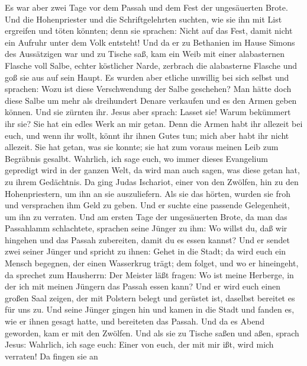  Es war aber zwei Tage vor dem Passah und dem Fest der
ungesäuerten Brote. Und die Hohenpriester und die Schriftgelehrten
suchten, wie sie ihn mit List ergreifen und töten könnten;
 denn sie sprachen: Nicht auf das Fest, damit nicht ein
Aufruhr unter dem Volk entsteht!  Und da er zu Bethanien
im Hause Simons des Aussätzigen war und zu Tische saß, kam ein Weib mit
einer alabasternen Flasche voll Salbe, echter köstlicher Narde, zerbrach
die alabasterne Flasche und goß sie aus auf sein Haupt. 
Es wurden aber etliche unwillig bei sich selbst und sprachen: Wozu ist
diese Verschwendung der Salbe geschehen?  Man hätte doch
diese Salbe um mehr als dreihundert Denare verkaufen und es den Armen
geben können. Und sie zürnten ihr.  Jesus aber sprach:
Lasset sie! Warum bekümmert ihr sie? Sie hat ein edles Werk an mir
getan.  Denn die Armen habt ihr allezeit bei euch, und
wenn ihr wollt, könnt ihr ihnen Gutes tun; mich aber habt ihr nicht
allezeit.  Sie hat getan, was sie konnte; sie hat zum
voraus meinen Leib zum Begräbnis gesalbt.  Wahrlich, ich
sage euch, wo immer dieses Evangelium gepredigt wird in der ganzen Welt,
da wird man auch sagen, was diese getan hat, zu ihrem Gedächtnis.
 Da ging Judas Ischariot, einer von den Zwölfen, hin zu
den Hohenpriestern, um ihn an sie auszuliefern.  Als sie
das hörten, wurden sie froh und versprachen ihm Geld zu geben. Und er
suchte eine passende Gelegenheit, um ihn zu verraten. 
Und am ersten Tage der ungesäuerten Brote, da man das Passahlamm
schlachtete, sprachen seine Jünger zu ihm: Wo willst du, daß wir
hingehen und das Passah zubereiten, damit du es essen kannst?
 Und er sendet zwei seiner Jünger und spricht zu ihnen:
Gehet in die Stadt; da wird euch ein Mensch begegnen, der einen
Wasserkrug trägt; dem folget,  und wo er hineingeht, da
sprechet zum Hausherrn: Der Meister läßt fragen: Wo ist meine Herberge,
in der ich mit meinen Jüngern das Passah essen kann?  Und
er wird euch einen großen Saal zeigen, der mit Polstern belegt und
gerüstet ist, daselbst bereitet es für uns zu.  Und seine
Jünger gingen hin und kamen in die Stadt und fanden es, wie er ihnen
gesagt hatte, und bereiteten das Passah.  Und da es Abend
geworden, kam er mit den Zwölfen.  Und als sie zu Tische
saßen und aßen, sprach Jesus: Wahrlich, ich sage euch: Einer von euch,
der mit mir ißt, wird mich verraten!  Da fingen sie an
